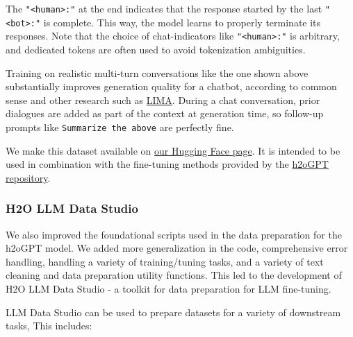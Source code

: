 \documentclass{article}
\begin{document}
The \texttt{"<human>:"} at the end indicates that the response started by the last \texttt{"<bot>:"} is complete. This way, the model learns to properly terminate its responses. Note that the choice of chat-indicators like \texttt{"<human>:"} is arbitrary, and dedicated tokens are often used to avoid tokenization ambiguities.

Training on realistic multi-turn conversations like the one shown above substantially improves generation quality for a chatbot, according to common sense and other research such as \href{https://arxiv.org/abs/2305.11206}{LIMA}. During a chat conversation, prior dialogues are added as part of the context at generation time, so follow-up prompts like \texttt{Summarize the above} are perfectly fine.

We make this dataset available on \href{https://huggingface.co/datasets/h2oai/openassistant_oasst1_h2ogpt_graded}{our Hugging Face page}. It is intended to be used in combination with the fine-tuning methods provided by the \href{https://github.com/h2oai/h2ogpt/blob/main/FINETUNE.md}{h2oGPT repository}.

\subsubsection{H2O LLM Data Studio}
We also improved the foundational scripts used in the data preparation for the h2oGPT model. We added more generalization in the code, comprehensive error handling, handling a variety of training/tuning tasks, and a variety of text cleaning and data preparation utility functions. This led to the development of H2O LLM Data Studio - a toolkit for data preparation for LLM fine-tuning. 

LLM Data Studio can be used to prepare datasets for a variety of downstream tasks, This includes:
\end{document}
